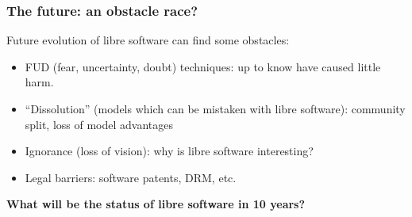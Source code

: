 
\begin{frame}
  \frametitle{The future: an obstacle race?}

  Future evolution of libre software can find some obstacles:

  \begin{itemize}
  \item FUD (fear, uncertainty, doubt) techniques: up to know have
    caused little harm.
  \item ``Dissolution'' (models which can be mistaken with libre
    software): community split, loss of model advantages
  \item Ignorance (loss of vision): why is libre software interesting?
  \item Legal barriers: software patents, DRM, etc.
  \end{itemize}

\end{frame}


\begin{frame}

  \begin{center}
  {\LARGE \bf What will be the status of libre software in 10 years?}
  \end{center}

\end{frame}
